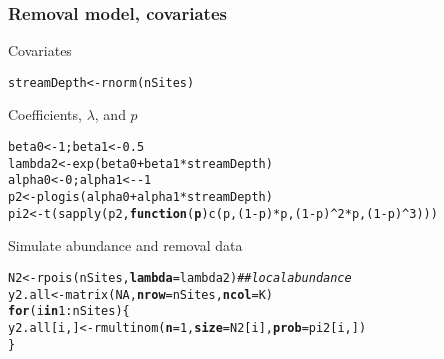 \documentclass[color=usenames,dvipsnames]{beamer}\usepackage[]{graphicx}\usepackage[]{color}
\makeatletter
\newcommand{\hlnum}[1]{\textcolor[rgb]{0.69,0.494,0}{#1}}%
\newcommand{\hlcom}[1]{\textcolor[rgb]{0.514,0.506,0.514}{\textit{#1}}}%
\newcommand{\hlopt}[1]{\textcolor[rgb]{0,0,0}{#1}}%
\newcommand{\hlstd}[1]{\textcolor[rgb]{0,0,0}{#1}}%
\newcommand{\hlkwa}[1]{\textcolor[rgb]{0,0,0}{\textbf{#1}}}%
\newcommand{\hlkwb}[1]{\textcolor[rgb]{0,0.341,0.682}{#1}}%
\newcommand{\hlkwc}[1]{\textcolor[rgb]{0,0,0}{\textbf{#1}}}%
\newcommand{\hlkwd}[1]{\textcolor[rgb]{0.004,0.004,0.506}{#1}}%
\newenvironment{kframe}{%
 \def\at@end@of@kframe{}%
 \ifinner\ifhmode%
  \def\at@end@of@kframe{\end{minipage}}%
  \begin{minipage}{\columnwidth}%
 \fi\fi%
 \def\FrameCommand##1{\hskip\@totalleftmargin \hskip-\fboxsep
 \colorbox{shadecolor}{##1}\hskip-\fboxsep
     \hskip-\linewidth \hskip-\@totalleftmargin \hskip\columnwidth}%
 \MakeFramed {\advance\hsize-\width
   \@totalleftmargin\z@ \linewidth\hsize
   \@setminipage}}%
 {\par\unskip\endMakeFramed%
 \at@end@of@kframe}
\newenvironment{knitrout}{}{} %
\makeatother
\begin{document}
\begin{frame}[fragile]
  \frametitle{Removal model, covariates}
  \small
  Covariates
  \vspace{-6pt}
\begin{knitrout}\scriptsize
{}\color{fgcolor}\begin{kframe}
\begin{alltt}
\hlstd{streamDepth} \hlkwb{<-} \hlkwd{rnorm}\hlstd{(nSites)}
\end{alltt}
\end{kframe}
\end{knitrout}
\vfill
  Coefficients, $\lambda$, and $p$
  \vspace{-6pt}
\begin{knitrout}\scriptsize
{}\color{fgcolor}\begin{kframe}
\begin{alltt}
\hlstd{beta0} \hlkwb{<-} \hlnum{1}\hlstd{; beta1} \hlkwb{<-} \hlnum{0.5}
\hlstd{lambda2} \hlkwb{<-} \hlkwd{exp}\hlstd{(beta0} \hlopt{+} \hlstd{beta1}\hlopt{*}\hlstd{streamDepth)}
\hlstd{alpha0} \hlkwb{<-} \hlnum{0}\hlstd{; alpha1} \hlkwb{<-} \hlopt{-}\hlnum{1}
\hlstd{p2} \hlkwb{<-} \hlkwd{plogis}\hlstd{(alpha0} \hlopt{+} \hlstd{alpha1}\hlopt{*}\hlstd{streamDepth)}
\hlstd{pi2} \hlkwb{<-} \hlkwd{t}\hlstd{(}\hlkwd{sapply}\hlstd{(p2,} \hlkwa{function}\hlstd{(}\hlkwc{p}\hlstd{)} \hlkwd{c}\hlstd{(p, (}\hlnum{1}\hlopt{-}\hlstd{p)}\hlopt{*}\hlstd{p, (}\hlnum{1}\hlopt{-}\hlstd{p)}\hlopt{^}\hlnum{2}\hlopt{*}\hlstd{p, (}\hlnum{1}\hlopt{-}\hlstd{p)}\hlopt{^}\hlnum{3}\hlstd{)))}
\end{alltt}
\end{kframe}
\end{knitrout}
\vfill
  Simulate abundance and removal data
  \vspace{-6pt}
\begin{knitrout}\scriptsize
{}\color{fgcolor}\begin{kframe}
\begin{alltt}
\hlstd{N2} \hlkwb{<-} \hlkwd{rpois}\hlstd{(nSites,} \hlkwc{lambda}\hlstd{=lambda2)}         \hlcom{## local abundance }
\hlstd{y2.all} \hlkwb{<-} \hlkwd{matrix}\hlstd{(}\hlnum{NA}\hlstd{,} \hlkwc{nrow}\hlstd{=nSites,} \hlkwc{ncol}\hlstd{=K)}
\hlkwa{for}\hlstd{(i} \hlkwa{in} \hlnum{1}\hlopt{:}\hlstd{nSites) \{}
    \hlstd{y2.all[i,]} \hlkwb{<-} \hlkwd{rmultinom}\hlstd{(}\hlkwc{n}\hlstd{=}\hlnum{1}\hlstd{,} \hlkwc{size}\hlstd{=N2[i],} \hlkwc{prob}\hlstd{=pi2[i,])}
\hlstd{\}}
\end{alltt}



\end{kframe}
\end{knitrout}
\end{frame}
\end{document}
